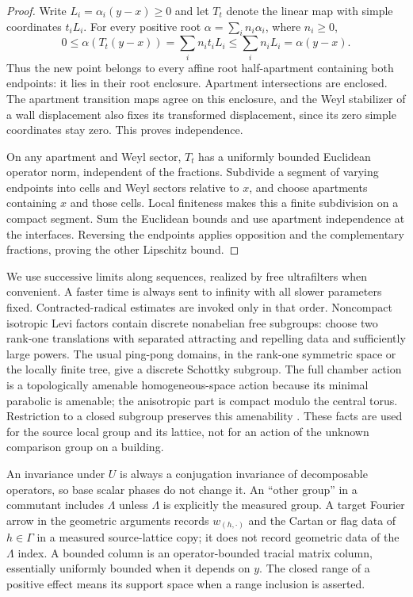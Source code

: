 \begin{proof}
Write $L_i=\alpha_i(y-x)\geq0$ and let $T_t$ denote the linear map
with simple coordinates $t_iL_i$.  For every positive root
$\alpha=\sum_i n_i\alpha_i$, where $n_i\geq0$,
\[
 0\leq\alpha(T_t(y-x))
      =\sum_i n_it_iL_i
      \leq\sum_i n_iL_i=\alpha(y-x).
\]
Thus the new point belongs to every affine root half-apartment
containing both endpoints: it lies in their root enclosure.
Apartment intersections are enclosed.  The apartment transition
maps agree on this enclosure, and the Weyl stabilizer of a wall
displacement also fixes its transformed displacement, since its zero
simple coordinates stay zero.  This proves independence.

On any apartment and Weyl sector, $T_t$ has a uniformly bounded
Euclidean operator norm, independent of the fractions.  Subdivide
a segment of varying endpoints into cells and Weyl sectors relative
to $x$, and choose apartments containing $x$ and those cells.
Local finiteness makes this a finite subdivision on a compact
segment.  Sum the Euclidean bounds and use apartment independence
at the interfaces.  Reversing the endpoints applies opposition and
the complementary fractions, proving the other Lipschitz bound.
\end{proof}

We use successive limits along sequences, realized by free
ultrafilters when convenient.  A faster time is always sent to
infinity with all slower parameters fixed.  Contracted-radical
estimates are invoked only in that order.  Noncompact isotropic Levi
factors contain discrete nonabelian free subgroups: choose two
rank-one translations with separated attracting and repelling data
and sufficiently large powers.  The usual ping-pong domains, in the
rank-one symmetric space or the locally finite tree, give a discrete
Schottky subgroup.  The full chamber action is a topologically
amenable homogeneous-space action because its minimal parabolic is
amenable; the anisotropic part is compact modulo the central torus.
Restriction to a closed subgroup preserves this amenability
\cite[Propositions~2.2 and~2.5, Example~2.7(5)]{AnantharamanDelaroche2002}.  These facts are used for the
source local group and its lattice, not for an action of the unknown
comparison group on a building.


\begin{convention}
\label{conv:setup-operators}
An invariance under $U$ is always a conjugation invariance of
decomposable operators, so base scalar phases do not change it.
An ``other group'' in a commutant includes $\Lambda$ unless
$\Lambda$ is explicitly the measured group.  A target Fourier arrow
in the geometric arguments records $w_{(h,\cdot)}$ and the Cartan
or flag data of $h\in\Gamma$ in a measured source-lattice copy;
it does not record geometric data of the $\Lambda$ index.  A bounded
column is an operator-bounded tracial matrix column, essentially
uniformly bounded when it depends on $y$.  The closed range of a
positive effect means its support space when a range inclusion is
asserted.
\end{convention}
